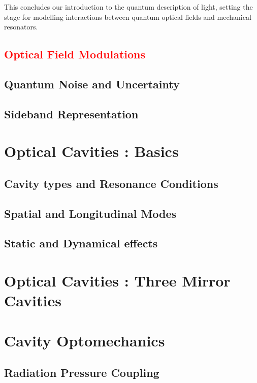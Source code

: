 \vspace{1em}
This concludes our introduction to the quantum description of light, setting the stage for modelling interactions between quantum optical fields and mechanical resonators.

\subsection{\textcolor{red}{Optical Field Modulations}}
\subsection{Quantum Noise and Uncertainty}
\subsection{Sideband Representation}
\hspace{1pt}

\section{Optical Cavities : Basics}
\subsection{Cavity types and Resonance Conditions}
\subsection{Spatial and Longitudinal Modes}
\subsection{Static and Dynamical effects}
\hspace{1pt}

\section{\color{red}Optical Cavities : Three Mirror Cavities }
\subsection{}
\hspace{1pt}

\section{Cavity Optomechanics}
\subsection{Radiation Pressure Coupling}

